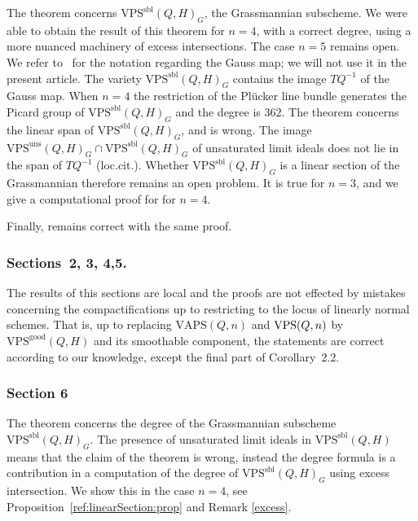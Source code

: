 \documentclass{amsart}
\newcommand{\VPSsbl}{{\mathrm{VPS}}^{\mathrm{sbl}}(Q, H)}
\newcommand{\VPSuns}{{\mathrm{VPS}}^{\mathrm{uns}}(Q, H)}
\newcommand{\VPSgood}{{\mathrm{VPS}}^{\mathrm{good}}(Q, H)}
\newcommand{\VAPS}{\mathrm{VAPS}(Q, n)}
\newenvironment{customthm}[1]
  {\renewcommand\theinnercustomthm{#1}\innercustomthm}
  {\endinnercustomthm}
\begin{document}
The theorem \cite[Theorem~1.2]{RS} concerns $\VPSsbl_G$, the Grassmannian subscheme. We
were able to obtain the result of this theorem for $n=4$, with a correct degree, using a more nuanced machinery
of excess intersections. The case $n=5$ remains open. We refer to~\cite{RS}
for the notation regarding the Gauss map; we will not use it in the present
article.
\begin{customthm}{1.2}[{Proposition~\ref{ref:linearSection:prop}}]
    The variety $\VPSsbl_G$ contains the image $TQ^{-1}$ of the Gauss map. When
    $n=4$ the restriction of the Pl\"ucker line bundle generates the Picard
    group of $\VPSsbl_G$ and the degree is $362$.
\end{customthm}
The theorem \cite[Theorem~1.3]{RS} concerns the linear span of $\VPSsbl_G$, and is wrong.  The image $\VPSuns_G\cap \VPSsbl_G$ of unsaturated limit ideals does not lie in the span of $TQ^{-1}$ (loc.cit.).  Whether $\VPSsbl_G$ is a linear section of the 
Grassmannian therefore remains an open problem.  It is true for $n=3$, and we give a computational proof for for $n=4$.

Finally, \cite[Proposition~1.4]{RS} remains correct with the same proof.
\subsubsection{Sections~2, 3, 4,5.}
The results of this sections are local and the proofs are not effected by
mistakes concerning the compactifications up to restricting to the locus of
linearly normal schemes. That is, up to replacing $\VAPS$ and ${\rm VPS}(Q,n)$ by 
$\VPSgood$ and its smoothable component, the statements are correct according to our
knowledge, except the final part of Corollary~2.2.

\subsubsection{Section 6}  The theorem \cite[Theorem~6.3]{RS} concerns the degree of the Grassmannian subscheme $\VPSsbl_G$.  The presence of unsaturated limit ideals in $\VPSsbl$ means that the claim of the theorem is wrong, instead the degree formula is a contribution in a computation of the degree of $\VPSsbl_G$ using excess intersection.
We show this in the case $n=4$, see Proposition~\ref{ref:linearSection:prop} and Remark \ref{excess}.
\end{document}
